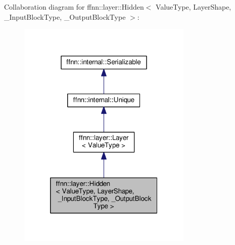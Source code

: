Collaboration diagram for ffnn\-:\-:layer\-:\-:Hidden$<$ Value\-Type, Layer\-Shape, \-\_\-\-Input\-Block\-Type, \-\_\-\-Output\-Block\-Type $>$\-:\nopagebreak
\begin{figure}[H]
\begin{center}
\leavevmode
\includegraphics[width=236pt]{classffnn_1_1layer_1_1_hidden__coll__graph}
\end{center}
\end{figure}
